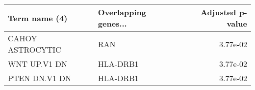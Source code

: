 \begin{tabular}{llr}
\toprule
   Term name (4) & Overlapping genes... &  Adjusted p-value \\
\midrule
CAHOY ASTROCYTIC &                  RAN &          3.77e-02 \\
    WNT UP.V1 DN &             HLA-DRB1 &          3.77e-02 \\
   PTEN DN.V1 DN &             HLA-DRB1 &          3.77e-02 \\
\bottomrule
\end{tabular}
